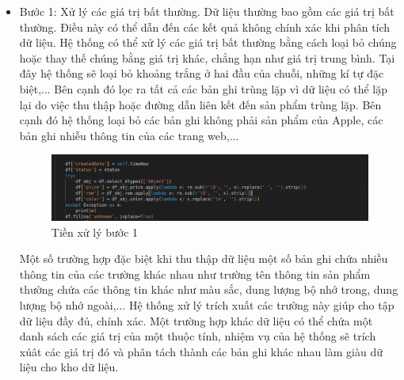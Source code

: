 \documentclass[../DoAn.tex]{subfiles}
\begin{document}
\begin{itemize}
    \item Bước 1: Xử lý các giá trị bất thường. Dữ liệu thường bao gồm các giá trị bất thường. Điều này có thể dẫn đến các kết quả không chính xác khi phân tích dữ liệu. Hệ thống có thể xử lý các giá trị bất thường bằng cách loại bỏ chúng hoặc thay thế chúng bằng giá trị khác, chẳng hạn như giá trị trung bình. Tại đây hệ thống sẽ loại bỏ khoảng trắng ở hai đầu của chuỗi, những kí tự đặc biệt,... Bên cạnh đó lọc ra tất cả các bản ghi trùng lặp vì dữ liệu có thể lặp lại do việc thu thập hoặc đường dẫn liên kết đến sản phẩm trùng lặp. Bên cạnh đó hệ thống loại bỏ các bản ghi không phải sản phẩm của Apple, các bản ghi nhiễu thông tin của các trang web,... 

    \begin{figure}[H]
        \centering
        \includegraphics[scale=0.34]{Hinhve/preprocess_step1.png}
        \caption{Tiền xử lý bước 1}
        \label{fig:my_label2}
    \end{figure}
    Một số trường hợp đặc biệt khi thu thập dữ liệu một số bản ghi chứa nhiều thông tin của các trường khác nhau như trường tên thông tin sản phẩm thường chứa các thông tin khác như màu sắc, dung lượng bộ nhớ trong, dung lượng bộ nhớ ngoài,... Hệ thống xử lý trích xuất các trường này giúp cho tập dữ liệu đầy đủ, chính xác. Một trường hợp khác dữ liệu có thể chứa một danh sách các giá trị của một thuộc tính, nhiệm vụ của hệ thống sẽ trích xúât các giá trị đó và phân tách thành các bản ghi khác nhau làm giàu dữ liệu cho kho dữ liệu.


\end{itemize}
\end{document}
